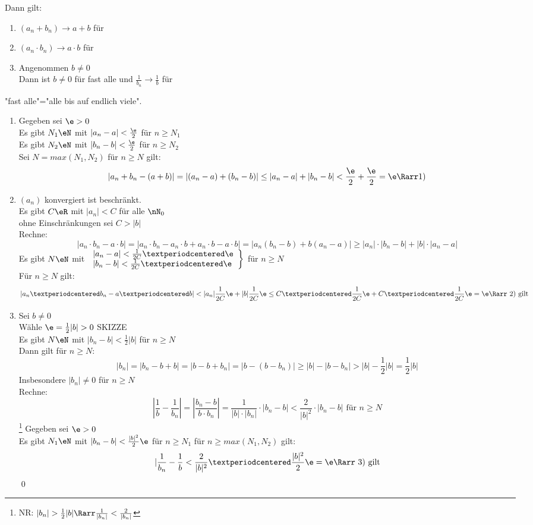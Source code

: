 Dann gilt:
\begin{enumerate}
\item{$(a_n+b_n)→a+b$ für \nif}
\item{$(a_n·b_n)→a·b$ für \nif}
\item{Angenommen $b\neq 0$\\
Dann ist $b\neq 0$ für fast alle \nN{} und $\frac{1}{b_n}→\frac{1}{b}$ für \nif}
\end{enumerate}
%
"fast alle"="alle bis auf endlich viele".
%
\bew
\begin{enumerate}
\item{Gegeben sei $\e>0$\\
Es gibt $N_1\eN$ mit $|a_n-a|<\frac{\e}{2}$ für $n\geq N_1$\\
Es gibt $N_2\eN$ mit $|b_n-b|<\frac{\e}{2}$ für $n\geq N_2$\\
Sei $N=max(N_1,N_2)$ für $n\geq N$ gilt:\\
$$|a_n+b_n-(a+b)|=|(a_n-a)+(b_n-b)|\leq |a_n-a|+|b_n-b|<\frac{\e}{2}+\frac{\e}{2}=\e \Rarr \text{1)}$$}
\item{$(a_n)$ konvergiert \Rarr{} ist beschränkt.\\
Es gibt $C\eR$ mit $|a_n|<C$ für alle $\nN_0$\\
ohne Einschränkungen sei $C>|b|$\\
Rechne:
$$|a_n·b_n-a·b|=|a_n·b_n-a_n·b+a_n·b-a·b|=|a_n(b_n-b)+b(a_n-a)|\geq |a_n|·|b_n-b|+|b|·|a_n-a|$$
Es gibt $N\eN$ mit $\left.\begin{array}{l}|a_n-a|<\frac{1}{2C}·\e\\|b_n-b|<\frac{1}{2C}·\e\end{array} \right\}$ für $n\geq N$\\
Für $n\geq N$ gilt:
$$|a_n·b_n-a·b|<|a_n|\frac{1}{2C}\e+|b|\frac{1}{2C}\e\leq C·\frac{1}{2C}\e+C·\frac{1}{2C}\e=\e \Rarr \text{ 2) gilt}$$}
\item{Sei $b\neq 0$\\
Wähle $\e=\frac{1}{2}|b|>0$ SKIZZE\\
Es gibt $N\eN$ mit $|b_n-b|<\frac{1}{2}|b|$ für $n\geq N$\\
Dann gilt für $n\geq N$:
$$|b_n|=|b_n-b+b|=|b-b+b_n|=|b-(b-b_n)|\geq |b|-|b-b_n|>|b|-\frac{1}{2}|b|=\frac{1}{2}|b|$$
Insbesondere $|b_n|\neq 0$ für $n\geq N$\\
Rechne:
$$\left|\frac{1}{b}-\frac{1}{b_n}\right|=\left|\frac{b_n-b}{b·b_n}\right|=\frac{1}{|b|·|b_n|}·|b_n-b|<\frac{2}{|b|^2}·|b_n-b| \text{ für $n\geq N$}$$\footnote{NR: $|b_n|>\frac{1}{2}|b| \Rarr \frac{1}{|b_n|}<\frac{2}{|b_n|}$}
Gegeben sei $\e>0$\\
Es gibt $N_1\eN$ mit $|b_n-b|<\frac{|b|^2}{2}\e$ für $n\geq N_1$\Rarr{} für $n\geq max(N_1,N_2)$ gilt:\\
$$|\frac{1}{b_n}-\frac{1}{b}<\frac{2}{|b|^2}·\frac{|b|^2}{2}\e=\e \Rarr \text{ 3) gilt}$$\qed}
\end{enumerate}

